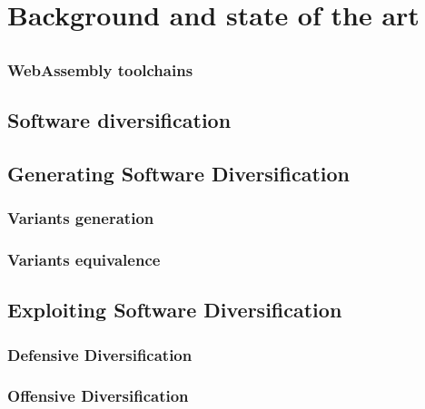 \chapter{Background and state of the art}
\label{SOTA}


\section{\Wasm}

\subsection{WebAssembly toolchains}


\section{Software diversification}

\section{Generating Software Diversification}

\subsection{Variants generation}

\subsection{Variants equivalence}


\section{Exploiting Software Diversification}

\subsection{Defensive Diversification}

\subsection{Offensive Diversification}


